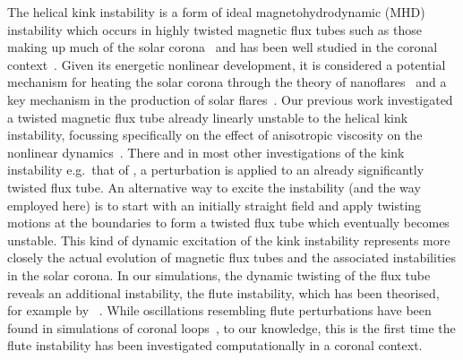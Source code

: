 \documentclass[fleqn,usenatbib]{mnras}
\newcommand{\rev}[1]{{\color{red} {#1}}}
\newcommand{\revcite}[1]{{\color{red} \underline{#1}}}
\begin{document}
The helical kink instability is a form of ideal magnetohydrodynamic (MHD)
instability which occurs in highly twisted magnetic flux tubes such as those
making up much of the solar corona~\citep{realeCoronalLoopsObservations2014}
and has been well studied in the coronal
context~\citep{hoodKinkInstabilitySolar1979,hoodCoronalHeatingMagnetic2009,browningSolarCoronalHeating2003b,barefordShockHeatingNumerical2015,quinnEffectAnisotropicViscosity2020}.
Given its energetic nonlinear development, it is considered a potential
mechanism for heating the solar corona through the theory of
nanoflares~\citep{klimchukSolvingCoronalHeating2006,browningMechanismsSolarCoronal1991}
and a key mechanism in the production of solar
flares~\citep{hoodKinkInstabilitySolar1979}. \rev{Our previous work}
investigated a twisted magnetic flux tube already linearly unstable to
the 
helical kink instability, focussing specifically on the effect of anisotropic
viscosity on the nonlinear
dynamics~\citep{quinnEffectAnisotropicViscosity2020}.
\rev{There and in} most other investigations of
the kink instability e.g.~that of \revcite{\citet{hoodCoronalHeatingMagnetic2009}},
a perturbation is applied to an already significantly twisted flux tube. An
alternative way to excite the instability (and the way employed here) is to
start with an initially straight field and apply twisting motions at the
boundaries to form a twisted flux tube which eventually becomes unstable. This
kind of dynamic excitation of the kink instability \rev{}
represents more closely the actual evolution of magnetic flux tubes and the
associated instabilities in the solar corona. In our simulations, the dynamic
twisting of the flux tube reveals an additional instability, the flute
instability, which has been theorised, for example
by~\revcite{\citet{priestMagnetohydrodynamicsSun2013}}. While oscillations resembling
flute perturbations have been found in simulations of coronal
loops~\citep{terradasEffectMagneticTwist2018}, to our knowledge, this is the
first time the flute instability has been investigated computationally in
a coronal context.
\end{document}
